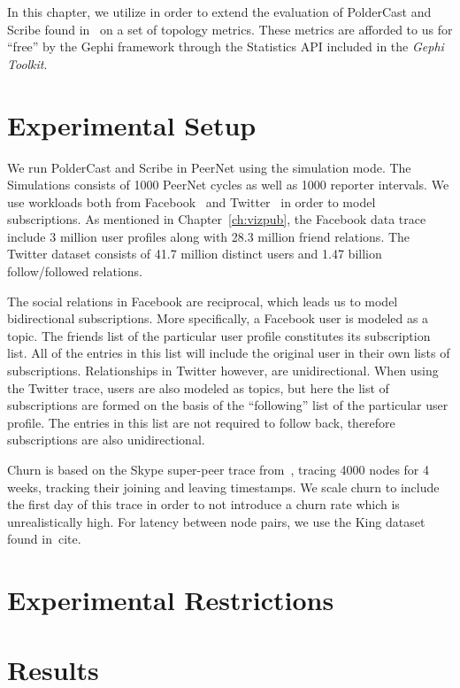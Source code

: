 In this chapter, we utilize \demo{} in order to extend the evaluation of
PolderCast and Scribe found in~\cite{Setty:2012} on a set of topology
metrics. These metrics are afforded to us for ``free'' by the Gephi
framework through the Statistics API included in the \emph{Gephi
    Toolkit}.

\section{Experimental Setup}

We run PolderCast and Scribe in PeerNet using the simulation mode. The
Simulations consists of 1000 PeerNet cycles as well as 1000 reporter
intervals. We use workloads both from Facebook~\cite{} and
Twitter~\cite{} in order to model subscriptions. As mentioned in
Chapter~\ref{ch:vizpub}, the Facebook data trace include 3 million user
profiles along with 28.3 million friend relations. The Twitter dataset
consists of 41.7 million distinct users and 1.47 billion
follow/followed relations.

The social relations in Facebook are reciprocal, which leads us to model
bidirectional subscriptions. More specifically, a Facebook user is
modeled as a topic. The friends list of the particular user profile
constitutes its subscription list. All of the entries in this list will
include the original user in their own lists of subscriptions.
Relationships in Twitter however, are unidirectional. When using the
Twitter trace, users are also modeled as topics, but here the list of
subscriptions are formed on the basis of the ``following'' list of the
particular  user profile. The entries in this list are not required to
follow back, therefore subscriptions are also unidirectional.

Churn is based on the Skype super-peer trace from~\cite{}, tracing 4000
nodes for 4 weeks, tracking their joining and leaving timestamps. We
scale churn to include the first day of this trace in order to not
introduce a churn rate which is unrealistically high. For latency
between node pairs, we use the King dataset found in~cite{}.

\section{Experimental Restrictions}

\section{Results}

